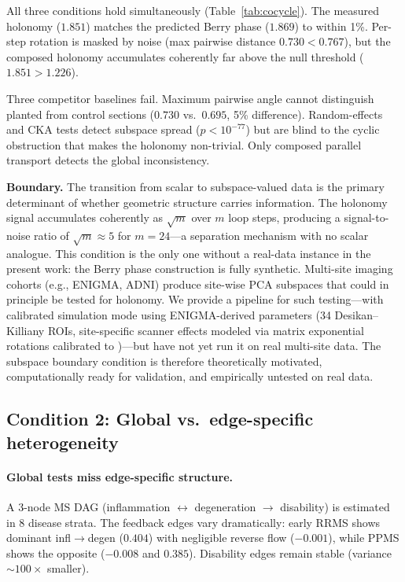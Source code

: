 \documentclass{article}
\begin{document}
All three conditions hold simultaneously (Table~\ref{tab:cocycle}).
The measured holonomy ($1.851$) matches the predicted Berry phase ($1.869$) to within 1\%.
Per-step rotation is masked by noise (max pairwise distance $0.730 < 0.767$), but the composed holonomy accumulates coherently far above the null threshold ($1.851 > 1.226$).

Three competitor baselines fail.
Maximum pairwise angle cannot distinguish planted from control sections ($0.730$ vs.\ $0.695$, 5\% difference).
Random-effects and CKA tests detect subspace spread ($p < 10^{-77}$) but are blind to the cyclic obstruction that makes the holonomy non-trivial.
Only composed parallel transport detects the global inconsistency.

\textbf{Boundary.} The transition from scalar to subspace-valued data is the primary determinant of whether geometric structure carries information.
The holonomy signal accumulates coherently as $\sqrt{m}$ over $m$ loop steps, producing a signal-to-noise ratio of $\sqrt{m} \approx 5$ for $m = 24$---a separation mechanism with no scalar analogue.
This condition is the only one without a real-data instance in the present work: the Berry phase construction is fully synthetic.
Multi-site imaging cohorts (e.g., ENIGMA, ADNI) produce site-wise PCA subspaces that could in principle be tested for holonomy. We provide a pipeline for such testing---with calibrated simulation mode using ENIGMA-derived parameters (34 Desikan--Killiany ROIs, site-specific scanner effects modeled via matrix exponential rotations calibrated to \citet{fortin2018harmonization})---but have not yet run it on real multi-site data.
The subspace boundary condition is therefore theoretically motivated, computationally ready for validation, and empirically untested on real data.

\subsection{Condition 2: Global vs.\ edge-specific heterogeneity}
\label{sec:res-global-vs-edge}

\paragraph{Global tests miss edge-specific structure.}
A 3-node MS DAG (inflammation $\leftrightarrow$ degeneration $\to$ disability) is estimated in 8 disease strata.
The feedback edges vary dramatically: early RRMS shows dominant infl$\to$degen ($0.404$) with negligible reverse flow ($-0.001$), while PPMS shows the opposite ($-0.008$ and $0.385$).
Disability edges remain stable (variance $\sim\!100\times$ smaller).
\end{document}

